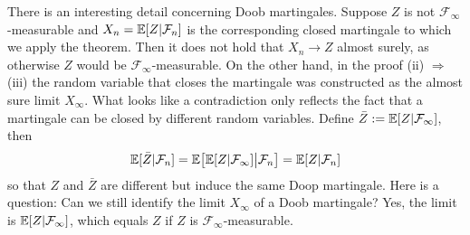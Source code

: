 

There is an interesting detail concerning Doob martingales. Suppose $Z$ is not $\mathcal F_\infty$-measurable and $X_n=\mathbb{E}[Z|\mathcal F_n]$ is the corresponding closed martingale to which we apply the theorem. Then it does not hold that $X_n\to Z$ almost surely, as otherwise $Z$ would be $\mathcal F_\infty$-measurable. On the other hand, in the proof (ii) $\Rightarrow$ (iii) the random variable that closes the martingale was constructed as the almost sure limit $X_\infty$. What looks like a contradiction only reflects the fact that a martingale can be closed by different random variables. Define $\bar Z:=\mathbb{E}[Z|\mathcal F_\infty]$, then
\begin{align*}
	\mathbb{E}[\bar Z|\mathcal F_n]=\mathbb{E}\big[\mathbb{E}[Z|\mathcal F_\infty]\big|\mathcal F_n\big]=\mathbb{E}[Z|\mathcal F_n]
\end{align*}
so that $Z$ and $\bar Z$ are different but induce the same Doop martingale. Here is a question: Can we still identify the limit $X_\infty$ of a Doob martingale? Yes, the limit is $\mathbb{E}[Z|\mathcal F_\infty]$, which equals $Z$ if $Z$ is $\mathcal F_\infty$-measurable.


